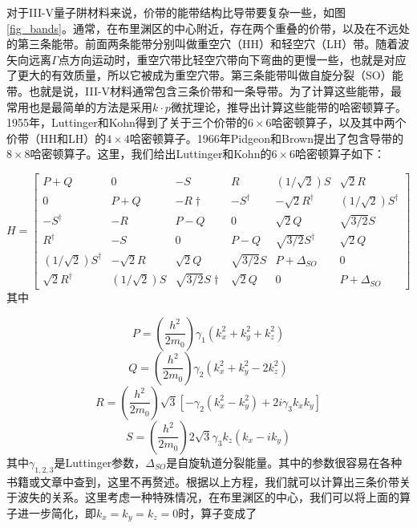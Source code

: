 \documentclass[oneside]{ZJUthesis}
\begin{document}
对于III-V量子阱材料来说，价带的能带结构比导带要复杂一些，如图\ref{fig_bands}。通常，在布里渊区的中心附近，存在两个重叠的价带，以及在不远处的第三条能带。前面两条能带分别叫做重空穴（HH）和轻空穴（LH）带。随着波矢向远离$\Gamma$点方向运动时，重空穴带比轻空穴带向下弯曲的更慢一些，也就是对应了更大的有效质量，所以它被成为重空穴带。第三条能带叫做自旋分裂（SO）能带。也就是说，III-V材料通常包含三条价带和一条导带。为了计算这些能带，最常用也是最简单的方法是采用$k\cdot p$微扰理论，推导出计算这些能带的哈密顿算子。1955年，Luttinger和Kohn得到了关于三个价带的$6\times6$哈密顿算子，以及其中两个价带（HH和LH）的$4\times4$哈密顿算子\cite{Luttinger1955Motion}。1966年Pidgeon和Brown提出了包含导带的$8\times8$哈密顿算子\cite{Pidgeon1966Interband}。这里，我们给出Luttinger和Kohn的$6\times6$哈密顿算子如下：

\begin{equation}
    \label{eq_6times6}
    H = \left[\begin{array}{cccccc}P+Q & 0 & -S & R & (1/\sqrt{2})S & \sqrt{2}R \\0 & P+Q & -R\dag & -S^\dag & -\sqrt{2}R^\dag & (1/\sqrt{2})S^\dag \\-S^\dag & -R & P-Q & 0 & \sqrt{2}Q & \sqrt{3/2}S \\R^\dag & -S & 0 & P-Q & \sqrt{3/2}S^\dag & \sqrt{2}Q \\(1/\sqrt{2})S^\dag & -\sqrt{2}R & \sqrt{2}Q & \sqrt{3/2}S & P+\Delta_{SO} & 0 \\\sqrt{2}R^\dag & (1/\sqrt{2})S & \sqrt{3/2}S\dag & \sqrt{2}Q & 0 & P+\Delta_{SO}\end{array}\right]
\end{equation}
其中

\begin{equation}
    P = \left( \frac{h^2}{2m_0} \right) \gamma_1 (k^2_x + k^2_y + k^2_z)
\end{equation}
\begin{equation}
    Q = \left( \frac{h^2}{2m_0} \right) \gamma_2 (k^2_x + k^2_y - 2k^2_z)
\end{equation}
\begin{equation}
    R = \left( \frac{h^2}{2m_0} \right) \sqrt{3} [-\gamma_2 (k^2_x - k^2_y) + 2i \gamma_3 k_x k_y]
\end{equation}
\begin{equation}
    S = \left( \frac{h^2}{2m_0} \right) 2 \sqrt{3} \gamma_3 k_z (k_x - ik_y)
\end{equation}
其中$\gamma_{1,2,3}$是Luttinger参数，$\Delta_{SO}$是自旋轨道分裂能量。其中的参数很容易在各种书籍或文章中查到，这里不再赘述。根据以上方程，我们就可以计算出三条价带关于波失的关系。这里考虑一种特殊情况，在布里渊区的中心，我们可以将上面的算子进一步简化，即$k_x=k_y=k_z=0$时，算子变成了
\end{document}
